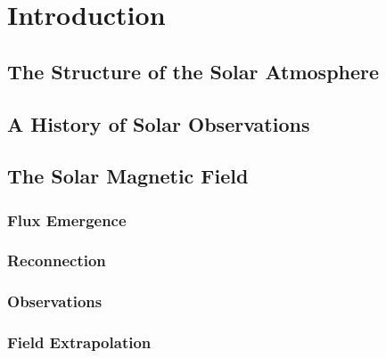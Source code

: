 \chapter{Introduction}\label{ch:introduction}


\section{The Structure of the Solar Atmosphere}

\section{A History of Solar Observations}

\section{The Solar Magnetic Field}

\subsection{Flux Emergence}


\subsection{Reconnection}

\subsection{Observations}


\subsection{Field Extrapolation}

